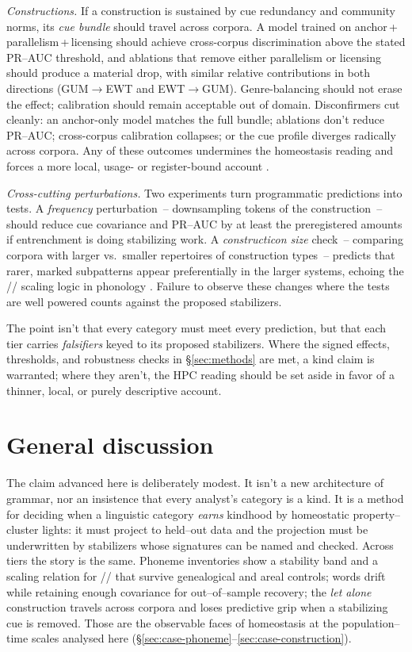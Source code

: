 \documentclass[12pt]{article}
\begin{document}
\emph{Constructions.} If a construction is sustained by cue redundancy and community norms, its \emph{cue bundle} should travel across corpora. A model trained on anchor\,+\,parallelism\,+\,licensing should achieve cross-corpus discrimination above the stated PR–AUC threshold, and ablations that remove either parallelism or licensing should produce a material drop, with similar relative contributions in both directions (GUM$\to$EWT and EWT$\to$GUM). Genre-balancing should not erase the effect; calibration should remain acceptable out of domain. Disconfirmers cut cleanly: an anchor-only model matches the full bundle; ablations don't reduce PR–AUC; cross-corpus calibration collapses; or the cue profile diverges radically across corpora. Any of these outcomes undermines the homeostasis reading and forces a more local, usage- or register-bound account \citep{FillmoreKayOConnor1988,StefanowitschGries2003}.

\emph{Cross-cutting perturbations.} Two experiments turn programmatic predictions into tests. A \emph{frequency} perturbation~-- downsampling tokens of the construction~-- should reduce cue covariance and PR–AUC by at least the preregistered amounts if entrenchment is doing stabilizing work. A \emph{constructicon size} check~-- comparing corpora with larger vs.\ smaller repertoires of construction types~-- predicts that rarer, marked subpatterns appear preferentially in the larger systems, echoing the // scaling logic in phonology \citep{Ekstrom2025PhonemeTool}. Failure to observe these changes where the tests are well powered counts against the proposed stabilizers.

The point isn't that every category must meet every prediction, but that each tier carries \emph{falsifiers} keyed to its proposed stabilizers. Where the signed effects, thresholds, and robustness checks in \S\ref{sec:methods} are met, a kind claim is warranted; where they aren't, the \textsc{HPC} reading should be set aside in favor of a thinner, local, or purely descriptive account.

\section{General discussion}\label{sec:discussion}

The claim advanced here is deliberately modest. It isn't a new architecture of grammar, nor an insistence that every analyst’s category is a kind. It is a method for deciding when a linguistic category \emph{earns} kindhood by homeostatic property–cluster lights: it must project to held–out data and the projection must be underwritten by stabilizers whose signatures can be named and checked. Across tiers the story is the same. Phoneme inventories show a stability band and a scaling relation for // that survive genealogical and areal controls; words drift while retaining enough covariance for out–of–sample recovery; the \emph{let alone} construction travels across corpora and loses predictive grip when a stabilizing cue is removed. Those are the observable faces of homeostasis at the population–time scales analysed here (\S\ref{sec:case-phoneme}–\ref{sec:case-construction}).
\end{document}
